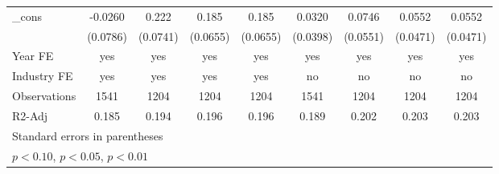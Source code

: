 \begin{table}[htbp]
\begin{tabular}{l*{8}{c}}
\_cons              &     -0.0260         &       0.222\sym{***}&       0.185\sym{***}&       0.185\sym{***}&      0.0320         &      0.0746         &      0.0552         &      0.0552         \\
                    &    (0.0786)         &    (0.0741)         &    (0.0655)         &    (0.0655)         &    (0.0398)         &    (0.0551)         &    (0.0471)         &    (0.0471)         \\
\hline
Year FE             &         yes         &         yes         &         yes         &         yes         &         yes         &         yes         &         yes         &         yes         \\
Industry FE         &         yes         &         yes         &         yes         &         yes         &          no         &          no         &          no         &          no         \\
Observations        &        1541         &        1204         &        1204         &        1204         &        1541         &        1204         &        1204         &        1204         \\
R2-Adj              &       0.185         &       0.194         &       0.196         &       0.196         &       0.189         &       0.202         &       0.203         &       0.203         \\
\hline\hline
\multicolumn{9}{l}{\footnotesize Standard errors in parentheses}\\
\multicolumn{9}{l}{\footnotesize \sym{*} \(p<0.10\), \sym{**} \(p<0.05\), \sym{***} \(p<0.01\)}\\
\end{tabular}
\end{table}
